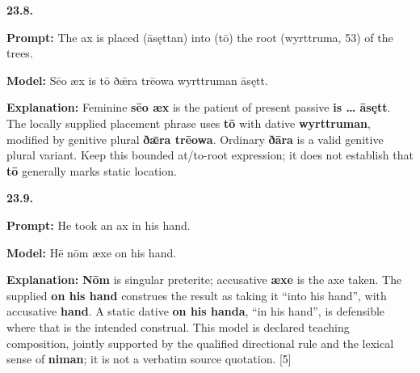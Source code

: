 \par\begin{minipage}{\linewidth}\raggedright
\textbf{23.8.}

\textbf{Prompt:} The ax is placed (āsęttan) into (tō) the root (wyrttruma, 53) of the trees.

\textbf{Model:} Sēo æx is tō ðǣra trēowa wyrttruman āsętt.

\textbf{Explanation:} Feminine \textbf{sēo æx} is the patient of present passive \textbf{is … āsętt}. The locally supplied placement phrase uses \textbf{tō} with dative \textbf{wyrttruman}, modified by genitive plural \textbf{ðǣra trēowa}. Ordinary \textbf{ðāra} is a valid genitive plural variant. Keep this bounded at/\allowbreak{}to-root expression; it does not establish that \textbf{tō} generally marks static location.

\end{minipage}\par\addvspace{4pt}

\par\begin{minipage}{\linewidth}\raggedright
\textbf{23.9.}

\textbf{Prompt:} He took an ax in his hand.

\textbf{Model:} Hē nōm æxe on his hand.

\textbf{Explanation:} \textbf{Nōm} is singular preterite; accusative \textbf{æxe} is the axe taken. The supplied \textbf{on his hand} construes the result as taking it “into his hand”, with accusative \textbf{hand}. A static dative \textbf{on his handa}, “in his hand”, is defensible where that is the intended construal. This model is declared teaching composition, jointly supported by the qualified directional rule and the lexical sense of \textbf{niman}; it is not a verbatim source quotation. [5]

\end{minipage}\par\addvspace{4pt}

